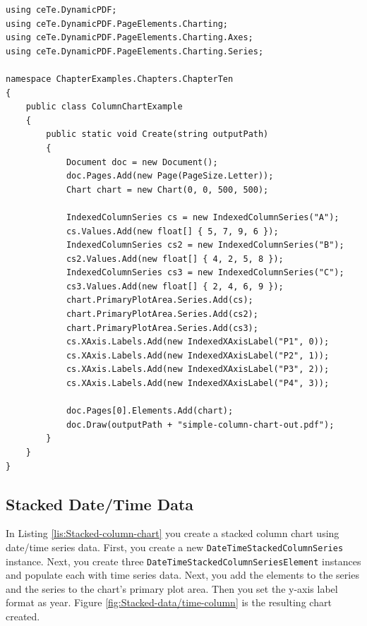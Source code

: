 \documentclass[american]{tufte-book}
\numberwithin{equation}{section}
\numberwithin{figure}{section}
\begin{document}
{\bgroup{}
\begin{lstlisting}[caption={Column chart with indexed data.},label={lis:Column-chart-with},basicstyle={\footnotesize\ttfamily},breaklines=true]
using ceTe.DynamicPDF;
using ceTe.DynamicPDF.PageElements.Charting;
using ceTe.DynamicPDF.PageElements.Charting.Axes;
using ceTe.DynamicPDF.PageElements.Charting.Series;

namespace ChapterExamples.Chapters.ChapterTen
{
    public class ColumnChartExample
    {
        public static void Create(string outputPath)
        {
            Document doc = new Document();
            doc.Pages.Add(new Page(PageSize.Letter));
            Chart chart = new Chart(0, 0, 500, 500);

            IndexedColumnSeries cs = new IndexedColumnSeries("A");
            cs.Values.Add(new float[] { 5, 7, 9, 6 });
            IndexedColumnSeries cs2 = new IndexedColumnSeries("B");
            cs2.Values.Add(new float[] { 4, 2, 5, 8 });
            IndexedColumnSeries cs3 = new IndexedColumnSeries("C");
            cs3.Values.Add(new float[] { 2, 4, 6, 9 });
            chart.PrimaryPlotArea.Series.Add(cs);
            chart.PrimaryPlotArea.Series.Add(cs2);
            chart.PrimaryPlotArea.Series.Add(cs3);
            cs.XAxis.Labels.Add(new IndexedXAxisLabel("P1", 0));
            cs.XAxis.Labels.Add(new IndexedXAxisLabel("P2", 1));
            cs.XAxis.Labels.Add(new IndexedXAxisLabel("P3", 2));
            cs.XAxis.Labels.Add(new IndexedXAxisLabel("P4", 3));

            doc.Pages[0].Elements.Add(chart);
            doc.Draw(outputPath + "simple-column-chart-out.pdf");
        }
    }
}
\end{lstlisting}
\leavevmode\egroup


\subsection{Stacked Date/Time Data}

In Listing \ref{lis:Stacked-column-chart} you create a stacked column
chart using date/time series data. First, you create a new \texttt{DateTimeStackedColumnSeries}
instance. Next, you create three \texttt{DateTimeStackedColumnSeriesElement}
instances and populate each with time series data. Next, you add the
elements to the series and the series to the chart's primary plot
area. Then you set the y-axis label format as year. Figure \ref{fig:Stacked-data/time-column}
is the resulting chart created.

}
\end{document}
